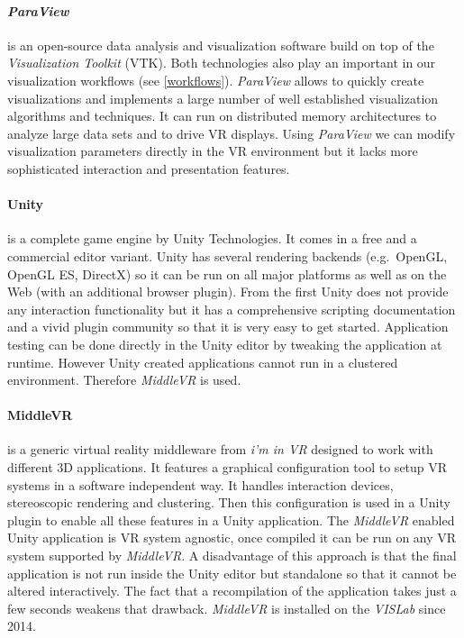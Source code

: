 \paragraph{\emph{ParaView}} \cite{paraview}
is an open-source data analysis and visualization software build on top of the \emph{Visualization Toolkit} \cite{vtk} (VTK). Both technologies also play an important in our visualization workflows (see \ref{workflows}). \emph{ParaView} allows to quickly create visualizations and implements a large number of well established visualization algorithms and techniques. It can run on distributed memory architectures to analyze large data sets and to drive VR displays. Using \emph{ParaView} we can modify visualization parameters directly in the VR environment but it lacks more sophisticated interaction and presentation features.

\paragraph{Unity}
is a complete game engine by Unity Technologies. It comes in a free and a commercial editor variant. Unity has several rendering backends (e.g.~OpenGL, OpenGL ES, DirectX) so it can be run on all major platforms as well as on the Web (with an additional browser plugin). From the first Unity does not provide any interaction functionality but it has a comprehensive scripting documentation and a vivid plugin community so that it is very easy to get started. Application testing can be done directly in the Unity editor by tweaking the application at runtime. However Unity created applications cannot run in a clustered environment. Therefore \emph{MiddleVR} is used.

\paragraph{MiddleVR}
is a generic virtual reality middleware from \emph{i'm in VR} designed to work with different 3D applications. It features a graphical configuration tool to setup VR systems in a software independent way. It handles interaction devices, stereoscopic rendering and clustering. Then this configuration is used in a Unity plugin to enable all these features in a Unity application. The \emph{MiddleVR} enabled Unity application is VR system agnostic, once compiled it can be run on any VR system supported by \emph{MiddleVR}. A disadvantage of this approach is that the final application is not run inside the Unity editor but standalone so that it cannot be altered interactively. The fact that a recompilation of the application takes just a few seconds weakens that drawback. \emph{MiddleVR} is installed on the \emph{VISLab} since 2014.

